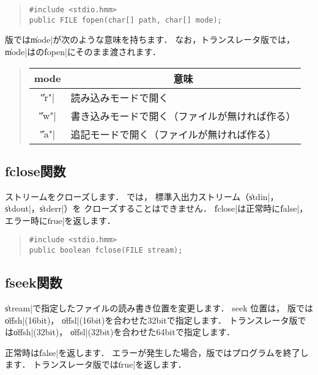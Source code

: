 \begin{quote}
\begin{verbatim}
#include <stdio.hmm>
public FILE fopen(char[] path, char[] mode);
\end{verbatim}
\end{quote}

{\tacos}版では\|mode|が次のような意味を持ちます．
なお，トランスレータ版では，\|mode|は{\cl}の\|fopen|にそのまま渡されます．

\begin{quote}
\begin{tabular}{c|l}
\multicolumn{1}{c|}{mode} & \multicolumn{1}{c}{意味} \\\hline
\|"r"| & 読み込みモードで開く \\
\|"w"| & 書き込みモードで開く（ファイルが無ければ作る） \\
\|"a"| & 追記モードで開く（ファイルが無ければ作る）
\end{tabular}
\end{quote}


\subsection{fclose関数}

ストリームをクローズします．
\tacos では，
標準入出力ストリーム（\|stdin|，\|stdout|，\|stderr|）を
クローズすることはできません．
\|fclose|は正常時に\|false|，
エラー時に\|true|を返します．

\begin{quote}
\begin{verbatim}
#include <stdio.hmm>
public boolean fclose(FILE stream);
\end{verbatim}
\end{quote}

\subsection{fseek関数}

\|stream|で指定したファイルの読み書き位置を変更します．
seek 位置は，
{\tacos}版では\|offsh|(16bit)，
\|offsl|(16bit)を合わせた32bitで指定します．
トランスレータ版では\|offsh|(32bit)，
\|offsl|(32bit)を合わせた64bitで指定します．

正常時は\|false|を返します．
エラーが発生した場合，{\tacos}版ではプログラムを終了します．
トランスレータ版では\|true|を返します．

